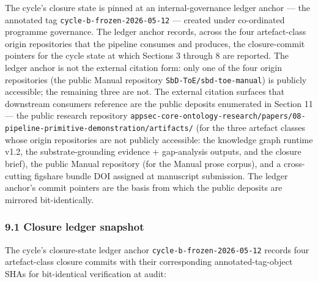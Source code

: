 \documentclass[
]{article}
\begin{document}
The cycle's closure state is pinned at an internal-governance ledger
anchor --- the annotated tag \texttt{cycle-b-frozen-2026-05-12} ---
created under co-ordinated programme governance. The ledger anchor
records, across the four artefact-class origin repositories that the
pipeline consumes and produces, the closure-commit pointers for the
cycle state at which Sections 3 through 8 are reported. The ledger
anchor is not the external citation form: only one of the four origin
repositories (the public Manual repository
\texttt{SbD-ToE/sbd-toe-manual}) is publicly accessible; the remaining
three are not. The external citation surfaces that downstream consumers
reference are the public deposits enumerated in Section 11 --- the
public research repository
\texttt{appsec-core-ontology-research/papers/08-pipeline-primitive-demonstration/artifacts/}
(for the three artefact classes whose origin repositories are not
publicly accessible: the knowledge graph runtime v1.2, the
substrate-grounding evidence + gap-analysis outputs, and the closure
brief), the public Manual repository (for the Manual prose corpus), and
a cross-cutting figshare bundle DOI assigned at manuscript submission.
The ledger anchor's commit pointers are the basis from which the public
deposits are mirrored bit-identically.

\subsubsection{9.1 Closure ledger
snapshot}\label{closure-ledger-snapshot}

The cycle's closure-state ledger anchor
\texttt{cycle-b-frozen-2026-05-12} records four artefact-class closure
commits with their corresponding annotated-tag-object SHAs for
bit-identical verification at audit:
\end{document}
